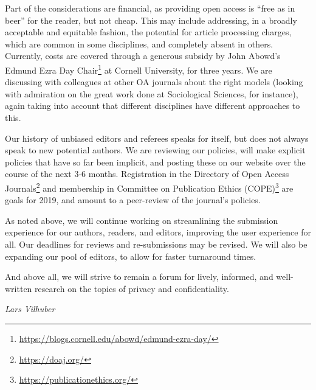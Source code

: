 \documentclass{jpcfinal} %
\newcommand{\urlcite}[2]{#2\footnote{\url{#1}}}
\begin{document}
Part of the considerations are financial, as providing open access is ``free as in beer'' for the reader, but not cheap. This may include addressing, in a broadly acceptable and equitable fashion, the potential for article processing charges, which are common in some disciplines, and completely absent in others. Currently, costs are covered through a generous subsidy by John Abowd's 
 \urlcite{https://blogs.cornell.edu/abowd/edmund-ezra-day/}{Edmund Ezra Day Chair}  at Cornell University, for three years. We are discussing with colleagues at other OA journals about the right models (looking with admiration on the great work done at Sociological Sciences, for instance), again taking into account that different disciplines have different approaches to this.
 
Our history of unbiased editors and referees speaks for itself, but does not always speak to new potential authors. We are reviewing our policies, will make explicit policies that have so far been implicit, and posting these on our website over the course of the next 3-6 months. Registration in the \urlcite{https://doaj.org/}{Directory of Open Access Journals} and membership in \urlcite{https://publicationethics.org/}{Committee on Publication Ethics (COPE)} are goals for 2019, and amount to a peer-review of the journal's policies. 

As noted above, we will continue working on streamlining the submission experience for our authors, readers, and editors, improving the user experience for all. Our deadlines for reviews and re-submissions may be revised. We will also be expanding our pool of editors, to allow for faster turnaround times. 

And above all, we will strive to remain a forum for lively, informed, and well-written research on the topics of privacy and confidentiality.

\hfill \it Lars Vilhuber



\end{document}
